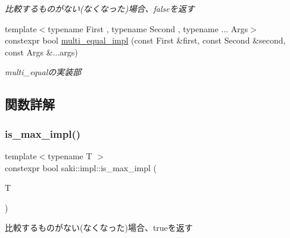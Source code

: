 \begin{DoxyCompactItemize}
\begin{DoxyCompactList}\small\item\em 比較するものがない(なくなった)場合、falseを返す \end{DoxyCompactList}\item 
{\footnotesize template$<$typename First , typename Second , typename ... Args$>$ }\\constexpr bool \mbox{\hyperlink{namespacesaki_1_1impl_afd0543c20cbd7373bceba87c2af5b3de}{multi\+\_\+equal\+\_\+impl}} (const First \&first, const Second \&second, const Args \&...args)
\begin{DoxyCompactList}\small\item\em multi\+\_\+equalの実装部 \end{DoxyCompactList}\end{DoxyCompactItemize}


\subsection{関数詳解}
\mbox{\label{namespacesaki_1_1impl_a43f254e0ea1de8b5cdfef3e108eff117}} 
\subsubsection{\texorpdfstring{is\+\_\+max\+\_\+impl()}{is\_max\_impl()}\hspace{0.1cm}{\footnotesize\ttfamily [1/2]}}
{\footnotesize\ttfamily template$<$typename T $>$ \\
constexpr bool saki\+::impl\+::is\+\_\+max\+\_\+impl (\begin{DoxyParamCaption}\item[{T}]{ }\end{DoxyParamCaption})}



比較するものがない(なくなった)場合、trueを返す 

\mbox{\label{namespacesaki_1_1impl_a3987211cbe7532fd94555a26554acba2}} 
